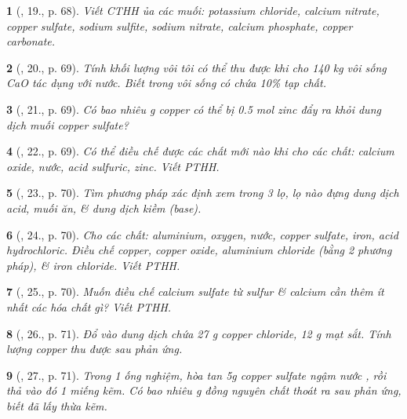 \documentclass{article}
\newtheorem{baitoan}{}
\begin{document}
\begin{baitoan}[\cite{An_Hoa_Hoc_nang_cao_8_9}, 19., p. 68]
	Viết CTHH ủa các muối: potassium chloride, calcium nitrate, copper sulfate, sodium sulfite, sodium nitrate, calcium phosphate, copper carbonate.
\end{baitoan}

\begin{baitoan}[\cite{An_Hoa_Hoc_nang_cao_8_9}, 20., p. 69]
	Tính khối lượng vôi tôi {\rm{}} có thể thu được khi cho {\rm 140 kg} vôi sống {\rm CaO} tác dụng với nước. Biết trong vôi sống có chứa {\rm10\%} tạp chất.
\end{baitoan}

\begin{baitoan}[\cite{An_Hoa_Hoc_nang_cao_8_9}, 21., p. 69]
	Có bao nhiêu {\rm g} copper có thể bị {\rm0.5 mol} zinc đẩy ra khỏi dung dịch muối copper sulfate?
\end{baitoan}

\begin{baitoan}[\cite{An_Hoa_Hoc_nang_cao_8_9}, 22., p. 69]
	Có thể điều chế được các chất mới nào khi cho các chất: calcium oxide, nước, acid sulfuric, zinc. Viết PTHH.
\end{baitoan}

\begin{baitoan}[\cite{An_Hoa_Hoc_nang_cao_8_9}, 23., p. 70]
	Tìm phương pháp xác định xem trong 3 lọ, lọ nào đựng dung dịch acid, muối ăn, \& dung dịch kiềm (base).
\end{baitoan}

\begin{baitoan}[\cite{An_Hoa_Hoc_nang_cao_8_9}, 24., p. 70]
	Cho các chất: aluminium, oxygen, nước, copper sulfate, iron, acid hydrochloric. Điều chế copper, copper oxide, aluminium chloride (bằng 2 phương pháp), \& iron chloride. Viết PTHH.
\end{baitoan}

\begin{baitoan}[\cite{An_Hoa_Hoc_nang_cao_8_9}, 25., p. 70]
	Muốn điều chế calcium sulfate từ sulfur \& calcium cần thêm ít nhất các hóa chất gì? Viết PTHH.
\end{baitoan}

\begin{baitoan}[\cite{An_Hoa_Hoc_nang_cao_8_9}, 26., p. 71]
	Đổ vào dung dịch chứa {\rm27 g} copper chloride, {\rm12 g} mạt sắt. Tính lượng copper thu được sau phản ứng.
\end{baitoan}

\begin{baitoan}[\cite{An_Hoa_Hoc_nang_cao_8_9}, 27., p. 71]
	Trong 1 ống nghiệm, hòa tan {\rm5g} copper sulfate ngậm nước {\rm{}}, rồi thả vào đó 1 miếng kẽm. Có bao nhiêu {\rm g} đồng nguyên chất thoát ra sau phản ứng, biết đã lấy thừa kẽm.
\end{baitoan}
\end{document}
